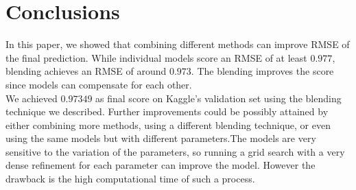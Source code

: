 \documentclass[10pt,conference,compsocconf]{IEEEtran}
\begin{document}
\section{Conclusions}
In this paper, we showed that combining different methods can improve RMSE of the final prediction. While individual models score an RMSE of at least $0.977$, blending achieves an RMSE of around $0.973$. The blending improves the score since models can compensate for each other. \\
We achieved $0.97349$ as final score on Kaggle's validation set using the blending technique we described. Further improvements could be possibly attained by either combining more methods, using a different blending technique, or even using the same models but with different parameters.The models are very sensitive to the variation of the parameters, so running a grid search with a very dense refinement for each parameter can improve the model. However the drawback is the high computational time of such a process. 


\end{document}

